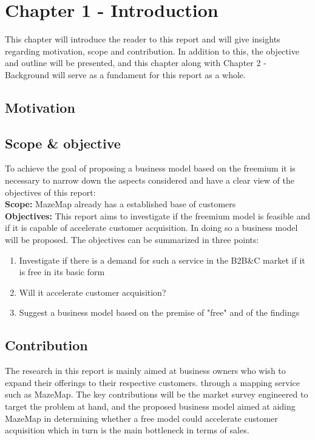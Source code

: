 \chapter{Chapter 1 - Introduction}
This chapter will introduce the reader to this report and will give insights regarding motivation, scope and contribution. In addition to this, the objective and outline will be presented, and this chapter along with Chapter 2 - Background will serve as a fundament for this report as a whole.
\section {Motivation}

\section {Scope \& objective}
To achieve the goal of proposing a business model based on the freemium it is necessary to narrow down the aspects considered and have a clear view of the objectives of this report:
\newline
\\
\textbf{Scope: }MazeMap already has a established base of customers
\newline
\\
\textbf{Objectives: }This report aims to investigate if the freemium model is feasible and if it is capable of accelerate customer acquisition. In doing so a business model will be proposed. The objectives can be summarized in three points:
\begin{enumerate}
\item Investigate if there is a demand for such a service in the B2B\&C market if it is free in its basic form
\item Will it accelerate customer acquisition?
\item Suggest a business model based on the premise of "free" and of the findings
\end{enumerate}
\section {Contribution}
The research in this report is mainly aimed at business owners who wish to expand their offerings to their respective customers. through a mapping service such as MazeMap. The key contributions will be the market survey engineered to target the problem at hand, and the proposed business model aimed at aiding MazeMap in determining whether a free model could accelerate customer acquisition which in turn is the main bottleneck in terms of sales.
